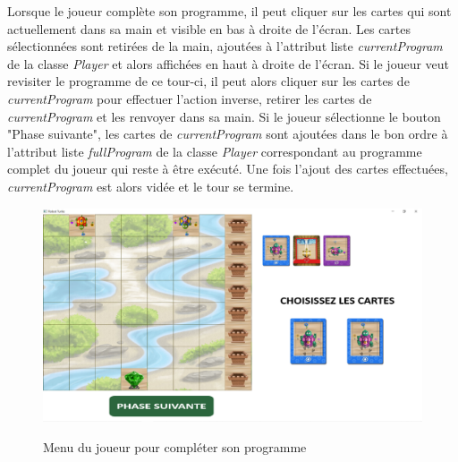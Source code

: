 \documentclass{article}
\begin{document}
Lorsque le joueur complète son programme, il peut cliquer sur les cartes qui sont actuellement dans sa main et visible en bas à droite de l'écran. Les cartes sélectionnées sont retirées de la main, ajoutées à l'attribut liste \textit{currentProgram} de la classe \textit{Player} et alors affichées en haut à droite de l'écran. Si le joueur veut revisiter le programme de ce tour-ci, il peut alors cliquer sur les cartes de \textit{currentProgram} pour effectuer l'action inverse, retirer les cartes de \textit{currentProgram} et les renvoyer dans sa main.
\medbreak
Si le joueur sélectionne le bouton "Phase suivante", les cartes de \textit{currentProgram} sont ajoutées dans le bon ordre à l'attribut liste \textit{fullProgram} de la classe \textit{Player} correspondant au programme complet du joueur qui reste à être exécuté. Une fois l'ajout des cartes effectuées, \textit{currentProgram} est alors vidée et le tour se termine.
\medbreak
\begin{figure}[!h]
	\begin{center}
		\includegraphics[scale=0.3]{../img/program_complete} \\
	\end{center}
	\caption{Menu du joueur pour compléter son programme}
\end{figure}  

\newpage
\end{document}
